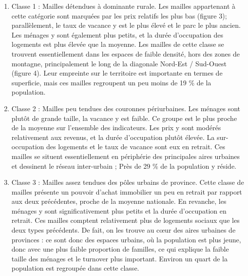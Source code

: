 \documentclass[12pt, a4paper]{article}
\begin{document}
\begin{enumerate}
\item Classe 1 : Mailles détendues à dominante rurale. Les mailles appartenant à cette catégorie sont marquées par les prix relatifs les plus bas (figure 3); parallèlement, le taux de vacance y est le plus élevé et le parc le plus ancien. Les ménages y sont également plus petits, et la durée d'occupation des logements est plus élevée que la moyenne. Les mailles de cette classe se trouvent essentiellement dans les espaces de faible densité, hors des zones de montagne, principalement le long de la diagonale Nord-Est / Sud-Ouest (figure 4). Leur empreinte sur le territoire est importante en termes de superficie, mais ces mailles regroupent un peu moins de 19 \% de la population.

\item Classe 2 : Mailles peu tendues des couronnes périurbaines. Les ménages sont plutôt de grande taille, la vacance y est faible. Ce groupe est le plus proche de la moyenne sur l'ensemble des indicateurs. Les prix y sont modérés relativement aux revenus, et la durée d'occupation plutôt élevée. La sur-occupation des logements et le taux de vacance sont eux en retrait. Ces mailles se situent essentiellement en périphérie des principales aires urbaines et dessinent le réseau inter-urbain ; Près de 29 \% de la population y réside.

\item Classe 3 : Mailles assez tendues des pôles urbains de province. Cette classe de mailles présente un pouvoir d'achat immobilier un peu en retrait par rapport aux deux précédentes, proche de la moyenne nationale. En revanche, les ménages y sont significativement plus petits et la durée d'occupation en retrait. Ces mailles comptent relativement plus de logements sociaux que les deux types précédents. De fait, on les trouve au c\oe ur des aires urbaines de provinces : ce sont donc des espaces urbains, où la population est plus jeune, donc avec une plus faible proportion de familles, ce qui explique la faible taille des ménages et le turnover plus important. Environ un quart de la population est regroupée dans cette classe.


\end{enumerate}
\end{document}
